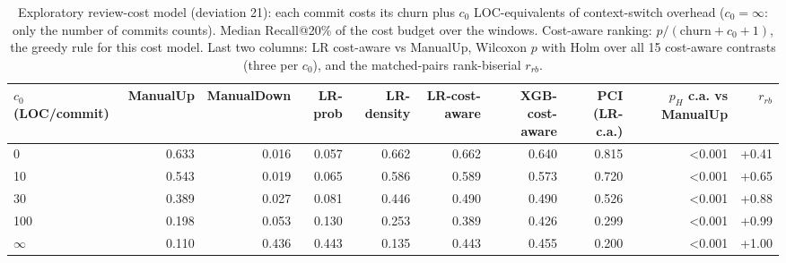 \begin{table}[t]
\centering
\footnotesize
\caption{Exploratory review-cost model (deviation 21): each commit costs its churn plus $c_0$ LOC-equivalents of context-switch overhead ($c_0=\infty$: only the number of commits counts). Median Recall@20\% of the cost budget over the windows. Cost-aware ranking: $p/(\mathrm{churn}+c_0+1)$, the greedy rule for this cost model. Last two columns: LR cost-aware vs ManualUp, Wilcoxon $p$ with Holm over all 15 cost-aware contrasts (three per $c_0$), and the matched-pairs rank-biserial $r_{rb}$.}
\label{tab:p2-hybrid}
\begin{adjustbox}{max width=\linewidth}
\begin{tabular}{lrrrrrrrrr}
\toprule
$c_0$ (LOC/commit) & ManualUp & ManualDown & LR-prob & LR-density & LR-cost-aware & XGB-cost-aware & PCI (LR-c.a.) & $p_H$ c.a. vs ManualUp & $r_{rb}$ \\
\midrule
0 & 0.633 & 0.016 & 0.057 & 0.662 & 0.662 & 0.640 & 0.815 & <0.001 & +0.41 \\
10 & 0.543 & 0.019 & 0.065 & 0.586 & 0.589 & 0.573 & 0.720 & <0.001 & +0.65 \\
30 & 0.389 & 0.027 & 0.081 & 0.446 & 0.490 & 0.490 & 0.526 & <0.001 & +0.88 \\
100 & 0.198 & 0.053 & 0.130 & 0.253 & 0.389 & 0.426 & 0.299 & <0.001 & +0.99 \\
$\infty$ & 0.110 & 0.436 & 0.443 & 0.135 & 0.443 & 0.455 & 0.200 & <0.001 & +1.00 \\
\bottomrule
\end{tabular}
\end{adjustbox}
\end{table}


